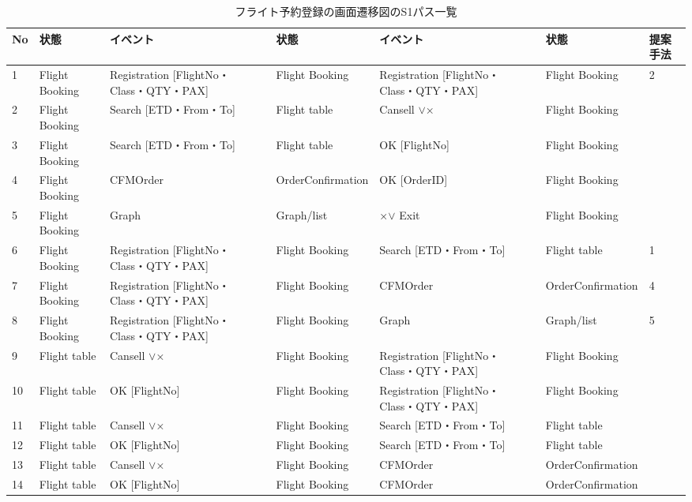 \begin{table}[t]
\scriptsize
\centering
  \caption{フライト予約登録の画面遷移図のS1パス一覧}
\begin{tabular}{p{1 em}|p{5 em}|p{9.5 em}|p{5 em}|p{9.5 em}|p{5 em}|p{2 em}}
    No    & 状態    & イベント   & 状態    & イベント& 状態 &提案手法\\
\hline
\hline
    1     & Flight Booking  & Registration [FlightNo・Class・QTY・PAX] & Flight Booking  & Registration [FlightNo・Class・QTY・PAX] & Flight Booking  &  2 \\
\hline
    2     & Flight Booking  & Search [ETD・From・To] & Flight table & Cansell $\lor$× & Flight Booking  &  \\
\hline
    3     & Flight Booking  & Search [ETD・From・To] & Flight table & OK [FlightNo] & Flight Booking  &  \\
\hline
    4     & Flight Booking  & CFMOrder & OrderConfirmation & OK [OrderID] & Flight Booking  &  \\
\hline
    5     & Flight Booking  & Graph & Graph/list & ×$\lor$ Exit & Flight Booking  &  \\
\hline
    6     & Flight Booking  & Registration [FlightNo・Class・QTY・PAX] & Flight Booking  & Search [ETD・From・To] & Flight table & 1 \\
\hline
    7     & Flight Booking  & Registration [FlightNo・Class・QTY・PAX] & Flight Booking  & CFMOrder & OrderConfirmation & 4 \\
\hline
    8     & Flight Booking  & Registration [FlightNo・Class・QTY・PAX] & Flight Booking  & Graph & Graph/list & 5 \\
\hline
    9     & Flight table & Cansell $\lor$× & Flight Booking  & Registration [FlightNo・Class・QTY・PAX] & Flight Booking  &  \\
\hline
    10    & Flight table & OK [FlightNo] & Flight Booking  & Registration [FlightNo・Class・QTY・PAX] & Flight Booking  &  \\
\hline
    11    & Flight table & Cansell $\lor$× & Flight Booking  & Search [ETD・From・To] & Flight table &  \\
\hline
    12    & Flight table & OK [FlightNo] & Flight Booking  & Search [ETD・From・To] & Flight table &  \\
\hline
    13    & Flight table & Cansell $\lor$× & Flight Booking  & CFMOrder & OrderConfirmation &  \\
\hline
    14    & Flight table & OK [FlightNo] & Flight Booking  & CFMOrder & OrderConfirmation &  \\

\end{tabular}
\end{table}
